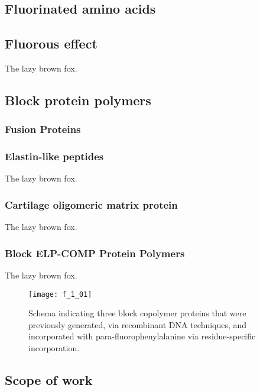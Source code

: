 \begin{refsection}
\subsection{Fluorinated amino acids}



\subsection{Fluorous effect}

The lazy brown fox.

\subsection{Block protein polymers}

\subsubsection{Fusion Proteins}

\subsubsection{Elastin-like peptides}

The lazy brown fox.

\subsubsection{Cartilage oligomeric matrix protein}

The lazy brown fox.

\subsubsection{Block ELP-COMP Protein Polymers}

The lazy brown fox.

\begin{figure}[h!]
    \centering
    \texttt{[image: f\_1\_01]}
    \caption{Schema indicating three block copolymer proteins that were
        previously generated, via recombinant DNA techniques, and incorporated
    with para-fluorophenylalanine via residue-specific incorporation.
    }
    \label{fig:pff_proteins}
\end{figure}

\subsection{Scope of work}


\end{refsection}
